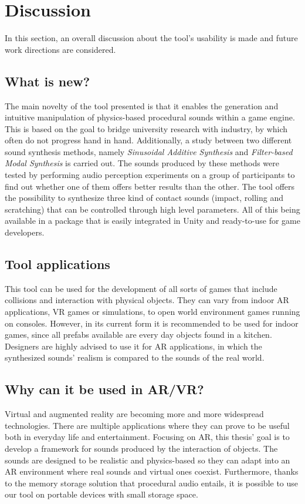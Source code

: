 \section{Discussion}
In this section, an overall discussion about the tool's usability is made and future work directions are considered.

\subsection{What is new?}
The main novelty of the tool presented is that it enables the generation and intuitive manipulation of physics-based procedural sounds within a game engine. This is based on the goal to bridge university research with industry, by which often do not progress hand in hand.
Additionally, a study between two different sound synthesis methods, namely \textit{Sinusoidal Additive Synthesis} and \textit{Filter-based Modal Synthesis} is carried out. The sounds produced by these methods were tested by performing audio perception experiments on a group of participants to find out whether one of them offers better results than the other.
The tool offers the possibility to synthesize three kind of contact sounds (impact, rolling and scratching) that can be controlled through high level parameters. All of this being available in a package that is easily integrated in Unity\textsuperscript{\textregistered} and ready-to-use for game developers. 

\subsection{Tool applications}
This tool can be used for the development of all sorts of games that include collisions and interaction with physical objects. They can vary from indoor \gls{AR} applications, \gls{VR} games or simulations, to open world environment games running on consoles. However, in its current form it is recommended to be used for indoor games, since all prefabs available are every day objects found in a kitchen. Designers are highly advised to use it for \gls{AR} applications, in which the synthesized sounds' realism is compared to the sounds of the real world.

\subsection{Why can it be used in AR/VR?}
Virtual and augmented reality are becoming more and more widespread technologies. There are multiple applications where they can prove to be useful both in everyday life and entertainment. Focusing on \gls{AR}, this thesis' goal is to develop a framework for sounds produced by the interaction of objects. The sounds are designed to be realistic and physics-based so they can adapt into an \gls{AR} environment where real sounds and virtual ones coexist. Furthermore, thanks to the memory storage solution that procedural audio entails, it is possible to use our tool on portable devices with small storage space.


